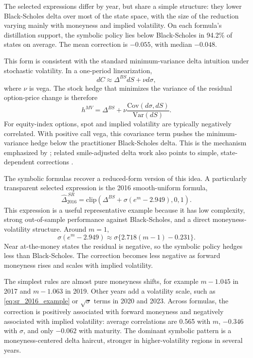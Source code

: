 \documentclass[a4paper,12pt]{article}
\numberwithin{equation}{section}
\begin{document}
The selected expressions differ by year, but share a simple structure: they lower Black-Scholes delta over most of the state space, with the size of the reduction varying mainly with moneyness and implied volatility. On each formula's distillation support, the symbolic policy lies below Black-Scholes in 94.2\% of states on average. The mean correction is $-0.055$, with median $-0.048$.

This form is consistent with the standard minimum-variance delta intuition under stochastic volatility. In a one-period linearization,
\[
    dC \approx \Delta^{BS} dS + \nu d\sigma,
\]
where $\nu$ is vega. The stock hedge that minimizes the variance of the residual option-price change is therefore
\[
    h^{MV}
    =
    \Delta^{BS}
    +
    \nu \frac{\mathrm{Cov}(d\sigma,dS)}{\mathrm{Var}(dS)} .
\]
For equity-index options, spot and implied volatility are typically negatively correlated. With positive call vega, this covariance term pushes the minimum-variance hedge below the practitioner Black-Scholes delta. This is the mechanism emphasized by \citet{hull2017optimal}; related smile-adjusted delta work also points to simple, state-dependent corrections \citep{alexander2012regime}.

The symbolic formulas recover a reduced-form version of this idea. A particularly transparent selected expression is the 2016 smooth-uniform formula,
\begin{equation}
    \widehat{\Delta}^{\,SR}_{2016}
    =
    \mathrm{clip}\left(
        \Delta^{BS}
        +
        \sigma\left(e^{m}-2.949\right),
        0,1
    \right).
    \label{eq:sr_2016_example}
\end{equation}
This expression is a useful representative example because it has low complexity, strong out-of-sample performance against Black-Scholes, and a direct moneyness-volatility structure. Around $m=1$,
\[
    \sigma(e^m-2.949)
    \approx
    \sigma\{2.718(m-1)-0.231\}.
\]
Near at-the-money states the residual is negative, so the symbolic policy hedges less than Black-Scholes. The correction becomes less negative as forward moneyness rises and scales with implied volatility.

The simplest rules are almost pure moneyness shifts, for example $m-1.045$ in 2017 and $m-1.063$ in 2019. Other years add a volatility scale, such as \eqref{eq:sr_2016_example} or $\sqrt{\sigma}$ terms in 2020 and 2023. Across formulas, the correction is positively associated with forward moneyness and negatively associated with implied volatility: average correlations are 0.565 with $m$, $-0.346$ with $\sigma$, and only $-0.062$ with maturity. The dominant symbolic pattern is a moneyness-centered delta haircut, stronger in higher-volatility regions in several years.
\end{document}
